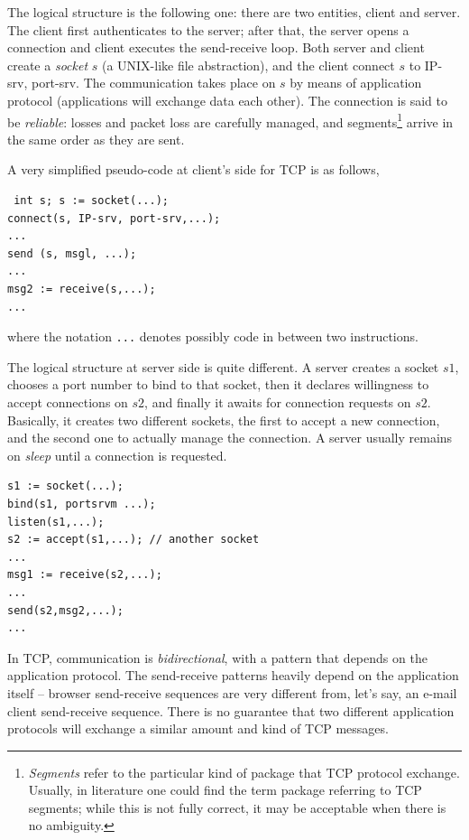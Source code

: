\documentclass[a4paper, 11pt]{report}
\begin{document}
The logical structure is the following one: there are two entities, client and
server. The client first authenticates to the server; after that, the server
opens a connection and client executes the send-receive loop. Both server and
client create a \emph{socket} $s$ (a UNIX-like file abstraction), and the
client connect $s$ to IP-srv, port-srv. The communication takes place on $s$ by
means of application protocol (applications will exchange data each other). The
connection is said to be \emph{reliable}: losses and packet loss are carefully
managed, and segments\footnote{\emph{Segments} refer to the particular kind of
package that TCP protocol exchange. Usually, in literature one could find the
term package referring to TCP segments; while this is not fully correct, it may
be acceptable when there is no ambiguity.} arrive in the same order as they are
sent.

A very simplified pseudo-code at client's side for TCP is as follows,

\begin{verbatim} int s; s := socket(...); 
connect(s, IP-srv, port-srv,...); 
...
send (s, msgl, ...); 
... 
msg2 := receive(s,...); 
... 
\end{verbatim}

where the notation \texttt{...} denotes possibly code in between two
instructions.

The logical structure at server side is quite different. A server creates
a socket $s1$, chooses a port number to bind to that socket, then it declares
willingness to accept connections on $s2$, and finally it awaits for connection
requests on $s2$. Basically, it creates two different sockets, the first to
accept a new connection, and the second one to actually manage the connection.
A server usually remains on \emph{sleep} until a connection is requested.

\begin{verbatim} 
s1 := socket(...);
bind(s1, portsrvm ...);
listen(s1,...);
s2 := accept(s1,...); // another socket 
... 
msg1 := receive(s2,...);
...
send(s2,msg2,...);
... 
\end{verbatim}

In TCP, communication is \emph{bidirectional}, with a pattern that depends on
the application protocol. The send-receive patterns heavily depend on the
application itself \--- browser send-receive sequences are very different from,
let's say, an e-mail client send-receive sequence. There is no guarantee that
two different application protocols will exchange a similar amount and kind of
TCP messages.
\end{document}
